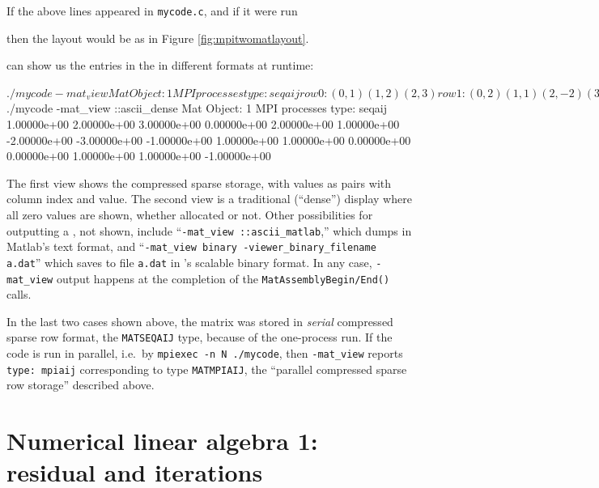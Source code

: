 \begin{marginfigure}

\caption{A parallel \pMat layout on two processes.  Blank entries are not allocated.}
\label{fig:mpitwomatlayout}
\end{marginfigure}

If the above lines appeared in \texttt{mycode.c}, and if it were run
then the layout would be as in Figure \ref{fig:mpitwomatlayout}.

\PETSc can show us the entries in the \pMat in different formats at runtime:
\begin{cline}
$ ./mycode -mat_view
Mat Object: 1 MPI processes
  type: seqaij
row 0: (0, 1)  (1, 2)  (2, 3)
row 1: (0, 2)  (1, 1)  (2, -2)  (3, -3)
row 2: (0, -1)  (1, 1)  (2, 1)  (3, 0)
row 3: (1, 1)  (2, 1)  (3, -1)
$ ./mycode -mat_view ::ascii_dense
Mat Object: 1 MPI processes
  type: seqaij
 1.00000e+00  2.00000e+00  3.00000e+00  0.00000e+00
 2.00000e+00  1.00000e+00  -2.00000e+00  -3.00000e+00
 -1.00000e+00  1.00000e+00  1.00000e+00  0.00000e+00
 0.00000e+00  1.00000e+00  1.00000e+00  -1.00000e+00
\end{cline}
The first view shows the compressed sparse storage, with values as pairs with column index and value.  The second view is a traditional (``dense'') display where all zero values are shown, whether allocated or not.  Other possibilities for outputting a \pMat, not shown, include ``\texttt{-mat\_view ::ascii\_matlab},'' which dumps in Matlab's text format, and ``\texttt{-mat\_view binary -viewer\_binary\_filename a.dat}'' which saves to file \texttt{a.dat} in \PETSc's scalable binary format.  In any case, \texttt{-mat\_view} output happens at the completion of the \texttt{MatAssemblyBegin/End()} calls.

In the last two cases shown above, the matrix was stored in \emph{serial} compressed sparse row format, the \texttt{MATSEQAIJ} type, because of the one-process run.  If the code is run in parallel, i.e.~by \texttt{mpiexec -n N ./mycode}, then \texttt{-mat\_view}  reports \texttt{type:~mpiaij} corresponding to \pMat type \texttt{MATMPIAIJ}, the ``parallel compressed sparse row storage'' described above.


\section{Numerical linear algebra 1: residual and iterations}

